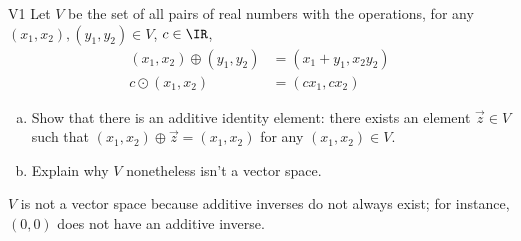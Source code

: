 \begin{problem}{V1}
 Let \(V\) be the set of all pairs of real numbers with the operations, for any \((x_1,x_2), (y_1,y_2) \in V\), \(c\in \IR\),
 \begin{align*}
 (x_1,x_2) \oplus (y_1,y_2) &= (x_1+y_1,x_2y_2) \\
 c \odot (x_1,x_2) &= (cx_1, cx_2)
 \end{align*}
 \begin{enumerate}[(a)]
 \item Show that there is an additive identity element:
       there exists an element \(\vec{z} \in V\) such that \((x_1,x_2)\oplus\vec{z}= (x_1,x_2)\) for any \( (x_1,x_2) \in V\).
\item Explain why \(V\) nonetheless isn't a vector space.
 \end{enumerate}
\end{problem}
\begin{solution}
\(V\) is not a vector space because additive inverses do not always exist; for instance, \((0,0)\) does not have an additive inverse.
\end{solution}
